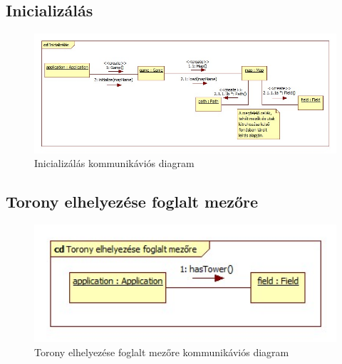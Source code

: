 \subsection{Inicializálás}
\begin{figure}[H]
\begin{center}
\includegraphics[width=17cm]{chapters/chapter05/images/cd_Inicializalas.jpg}
\caption{Inicializálás kommunikáviós diagram}
\label{fig:cd_Inicializalas}
\end{center}
\end{figure}

\subsection{Torony elhelyezése foglalt mezőre}
\begin{figure}[H]
\begin{center}
\includegraphics[width=17cm]{chapters/chapter05/images/cd_Torony_elhelyezese_foglalt_mezore.jpg}
\caption{Torony elhelyezése foglalt mezőre kommunikáviós diagram}
\label{fig:cd_Torony_elhelyezese_foglalt_mezore}
\end{center}
\end{figure}

